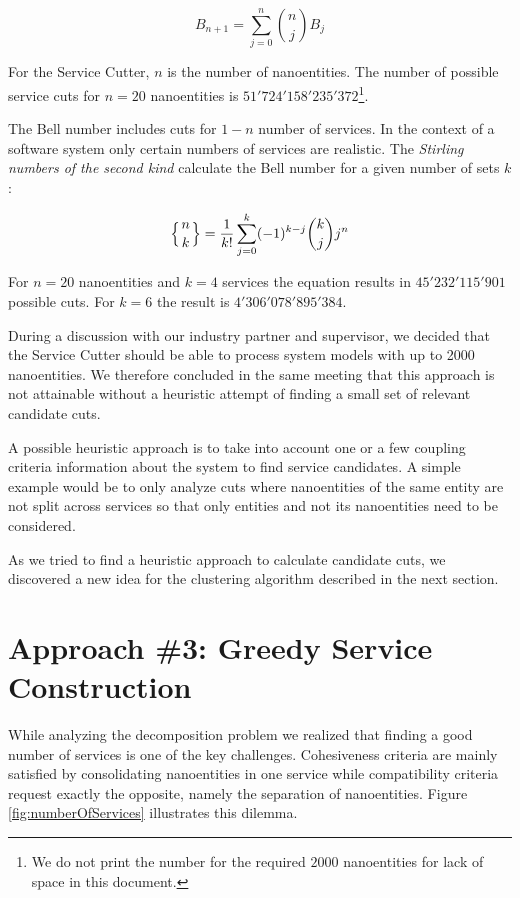 \begin{displaymath}
B_{n+1}=\sum_{j=0}^n {n\choose j} B_j
\end{displaymath}

For the Service Cutter, $n$ is the number of nanoentities. The number of possible service cuts for $n=20$ nanoentities is $51'724'158'235'372$\footnote{We do not print the number for the required $2000$ nanoentities for lack of space in this document.}.

The Bell number includes cuts for $1 - n$ number of services. In the context of a software system only certain numbers of services are realistic. The \textit{Stirling numbers of the second kind} calculate the Bell number for a given number of sets $k$:

\begin{displaymath}
\left\{ {n \atop k}\right\} = \frac{1}{k!}\sum_{j=0}^{k} (-1)^{k-j} \binom{k}{j} j^n
\end{displaymath}

For $n=20$ nanoentities and $k=4$ services the equation results in $45'232'115'901$ possible cuts. For $k=6$ the result is $4'306'078'895'384$.

During a discussion with our industry partner and supervisor, we decided that the Service Cutter should be able to process system models with up to 2000 nanoentities. We therefore concluded in the same meeting that this approach is not attainable without a heuristic attempt of finding a small set of relevant candidate cuts. 	

A possible heuristic approach is to take into account one or a few coupling criteria information about the system to find service candidates. A simple example would be to only analyze cuts where nanoentities of the same entity are not split across services so that only entities and not its nanoentities need to be considered.

As we tried to find a heuristic approach to calculate candidate cuts, we discovered a new idea for the clustering algorithm described in the next section. 

\section{Approach \#3: Greedy Service Construction}

While analyzing the decomposition problem we realized that finding a good number of services is one of the key challenges. Cohesiveness criteria are mainly satisfied by consolidating nanoentities in one service while compatibility criteria request exactly the opposite, namely the separation of nanoentities. Figure \ref{fig:numberOfServices} illustrates this dilemma.


